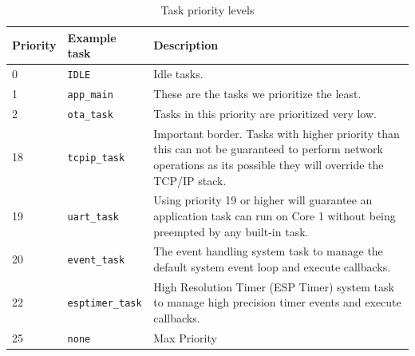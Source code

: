 \begin{table}[h!]
  \centering
  \caption{Task priority levels}
  \label{table:task-priorities}
  \begin{tabularx}{\textwidth}{p{1cm}Xp{10cm}}
    \hline
    \textbf{Priority} & \textbf{Example task} & \textbf{Description} \\ 
    \hline
    0 & \texttt{IDLE} & Idle tasks. \\
    \hline
    1 & \texttt{app\_main} & These are the tasks we prioritize the least.\\
    \hline
    2 & \texttt{ota\_task} & Tasks in this priority are prioritized very low.\\
    \hline
    18 & \texttt{tcpip\_task} & Important border. Tasks with higher priority than this can not be guaranteed to perform network operations as its possible they will override the TCP/IP stack. \\
    \hline
    19 & \texttt{uart\_task} & Using priority 19 or higher will guarantee an application task can run on Core 1 without being preempted by any built-in task\cite{espressif:esp-idf-programming-guide}. \\
    \hline
    20 & \texttt{event\_task} & The event handling system task to manage the default system event loop and execute callbacks. \\
    \hline
    22 & \texttt{esptimer\_task} & High Resolution Timer (ESP Timer) system task to manage high precision timer events and execute callbacks. \\
    \hline
    25 & \texttt{none} & Max Priority \\
    \hline
  \end{tabularx}
\end{table}
